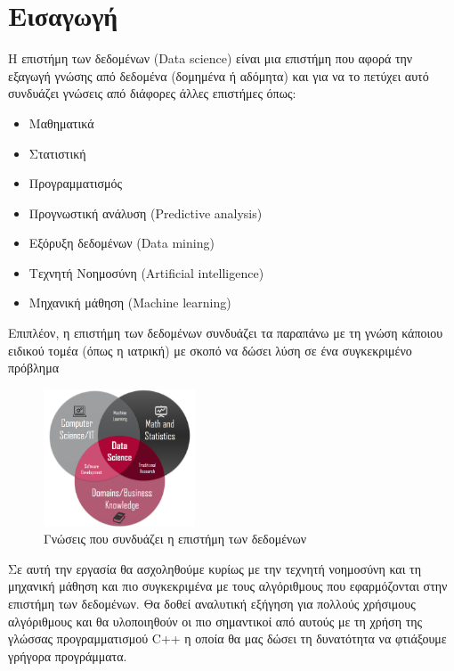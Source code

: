 \newpage
\section{Εισαγωγή}
Η επιστήμη των δεδομένων (\textlatin{Data science}) είναι
μια επιστήμη που αφορά την εξαγωγή γνώσης από δεδομένα
(δομημένα ή αδόμητα) και για να το πετύχει αυτό συνδυάζει
γνώσεις από διάφορες άλλες επιστήμες όπως:
\begin{itemize}
    \item Μαθηματικά
    \item Στατιστική
    \item Προγραμματισμός
    \item Προγνωστική ανάλυση (\textlatin{Predictive analysis})
    \item Εξόρυξη δεδομένων (\textlatin{Data mining})
    \item Τεχνητή Νοημοσύνη (\textlatin{Artificial intelligence})
    \item Μηχανική μάθηση (\textlatin{Machine learning})
\end{itemize}
Επιπλέον, η επιστήμη των δεδομένων συνδυάζει τα παραπάνω με
τη γνώση κάποιου ειδικού τομέα (όπως η ιατρική) με σκοπό να
δώσει λύση σε ένα συγκεκριμένο πρόβλημα \cite{wikiDS}
\begin{figure}[H]
    \centering
    \includegraphics[width=0.4\textwidth]{images/dataScienceKnowledge.png}
    \caption{Γνώσεις που συνδυάζει η επιστήμη των δεδομένων}
\end{figure}

Σε αυτή την εργασία θα ασχοληθούμε κυρίως με την τεχνητή
νοημοσύνη και τη μηχανική μάθηση και πιο συγκεκριμένα με τους
αλγόριθμους που εφαρμόζονται στην επιστήμη των δεδομένων.
Θα δοθεί αναλυτική εξήγηση για πολλούς χρήσιμους αλγόριθμους
και θα υλοποιηθούν οι πιο σημαντικοί από αυτούς με τη χρήση
της γλώσσας προγραμματισμού \textlatin{C++} η οποία θα μας δώσει τη
δυνατότητα να φτιάξουμε γρήγορα προγράμματα.

